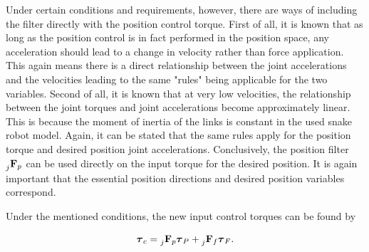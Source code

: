 Under certain conditions and requirements, however, there are ways of including the filter directly with the position control torque. First of all, it is known that as long as the position control is in fact performed in the position space, any acceleration should lead to a change in velocity rather than force application. This again means there is a direct relationship between the joint accelerations and the velocities leading to the same "rules" being applicable for the two variables. Second of all, it is known that at very low velocities, the relationship between the joint torques and joint accelerations become approximately linear. This is because the moment of inertia of the links is constant in the used snake robot model. Again, it can be stated that the same rules apply for the position torque and desired position joint accelerations. Conclusively, the position filter $\prescript{}{j}{\mathbf{F}}_{p}$ can be used directly on the input torque for the desired position. It is again important that the essential position directions and desired position variables correspond.

Under the mentioned conditions, the new input control torques can be found by

\begin{equation}
    \boldsymbol{\tau}_c = \prescript{}{j}{\mathbf{F}}_{p} \boldsymbol{\tau}_P + \prescript{}{j}{\mathbf{F}}_{f} \boldsymbol{\tau}_F.
\end{equation}
